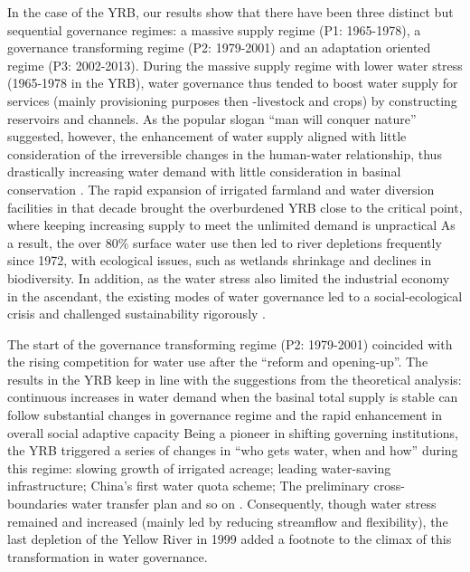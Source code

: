 In the case of the YRB, our results show that there have been three distinct but sequential governance regimes: a massive supply regime (P1: 1965-1978), a governance transforming regime (P2: 1979-2001) and an adaptation oriented regime (P3: 2002-2013).
During the massive supply regime with lower water stress (1965-1978 in the YRB), water governance thus tended to boost water supply for services (mainly provisioning purposes then -livestock and crops) by constructing reservoirs and channels.
As the popular slogan ``man will conquer nature'' suggested, however, the enhancement of water supply aligned with little consideration of the irreversible changes in the human-water relationship, thus drastically increasing water demand with little consideration in basinal conservation
\cite{zhouDecelerationChinahuman2020}.
The rapid expansion of irrigated farmland and water diversion facilities in that decade brought the overburdened YRB close to the critical point, where keeping increasing supply to meet the unlimited demand is unpractical
As a result, the over 80\% surface water use then led to river depletions frequently since 1972, with ecological issues, such as wetlands shrinkage and declines in biodiversity.
In addition, as the water stress also limited the industrial economy in the ascendant, the existing modes of water governance led to a social-ecological crisis and challenged sustainability rigorously
\cite{wohlfartRiverBasinCourse2016}.

The start of the governance transforming regime (P2: 1979-2001) coincided with the rising competition for water use after the ``reform and opening-up''.
The results in the YRB keep in line with the suggestions from the theoretical analysis: continuous increases in water demand when the basinal total supply is stable can follow substantial changes in governance regime and the rapid enhancement in overall social adaptive capacity %
Being a pioneer in shifting governing institutions, the YRB triggered a series of changes in ``who gets water, when and how'' during this regime: slowing growth of irrigated acreage; leading water-saving infrastructure; China's first water quota scheme; The preliminary cross-boundaries water transfer plan and so on
\cite{wangThirtyYearsYellow2018}.
Consequently, though water stress remained and increased (mainly led by reducing streamflow and flexibility), the last depletion of the Yellow River in 1999 added a footnote to the climax of this transformation in water governance.

